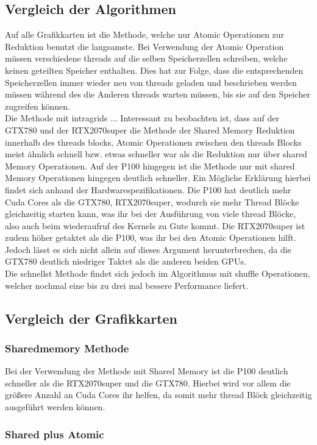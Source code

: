 \documentclass[10pt,a4paper]{article}
\begin{document}
	 \subsection{Vergleich der Algorithmen}
	 Auf alle Grafikkarten ist die Methode, welche nur Atomic Operationen zur Reduktion benutzt die langsamste. Bei Verwendung der Atomic Operation müssen verschiedene threads auf die selben Speicherzellen schreiben, welche keinen geteilten Speicher enthalten. Dies hat zur Folge, dass die entsprechenden Speicherzellen immer wieder neu von threads geladen und beschrieben werden müssen während des die Anderen threads warten müssen, bis sie auf den Speicher zugreifen können.\\
	 Die Methode mit intragrids ...
	 Interessant zu beobachten ist, dass auf der GTX780 und der RTX2070super die Methode der Shared Memory Reduktion innerhalb des threads blocks, Atomic Operationen zwischen den threads Blocks meist ähnlich schnell bzw. etwas schneller war als die Reduktion nur über shared Memory Operationen. Auf der P100 hingegen ist die Methode nur mit shared Memory Operationen hingegen deutlich schneller. Ein Mögliche Erklärung hierbei findet sich anhand der Hardwarespezifikationen. Die P100 hat deutlich mehr Cuda Cores als die GTX780, RTX2070super, wodurch sie mehr Thread Blöcke gleichzeitig starten kann, was ihr bei der Ausführung von viele thread Blöcke, also auch beim wiederaufruf des Kernels zu Gute kommt. Die RTX2070super ist zudem höher getaktet als die P100, was ihr bei den Atomic Operationen hilft. Jedoch lässt es sich nicht allein auf dieses Argument herunterbrechen, da die GTX780 deutlich niedriger Taktet als die anderen beiden GPUs.\\
	 Die schnellst Methode findet sich jedoch im Algorithmus mit shuffle Operationen, welcher nochmal eine bis zu drei mal bessere Performance liefert.
	 \subsection*{Vergleich der Grafikkarten}
	  \subsubsection{Sharedmemory Methode}
	  Bei der Verwendung der Methode mit Shared Memory ist die P100 deutlich schneller als die RTX2070super und die GTX780. Hierbei wird vor allem die größere Anzahl an Cuda Cores ihr helfen, da somit mehr thread Blöck gleichzeitig ausgeführt werden können.
	  \subsubsection{Shared plus Atomic}
\end{document}

